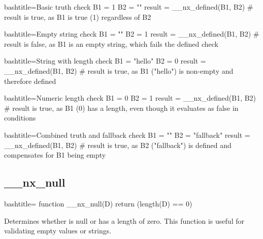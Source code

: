 \begin{NexCodeBox}{bash}{title={Basic truth check}}
	B1 = 1
	B2 = ""
	result = __nx_defined(B1, B2)
	# result is true, as B1 is true (1) regardless of B2
\end{NexCodeBox}

\begin{NexCodeBox}{bash}{title={Empty string check}}
	B1 = ""
	B2 = 1
	result = __nx_defined(B1, B2)
	# result is false, as B1 is an empty string, which fails the defined check
\end{NexCodeBox}

\begin{NexCodeBox}{bash}{title={String with length check}}
	B1 = "hello"
	B2 = 0
	result = __nx_defined(B1, B2)
	# result is true, as B1 ("hello") is non-empty and therefore defined
\end{NexCodeBox}

\begin{NexCodeBox}{bash}{title={Numeric length check}}
	B1 = 0
	B2 = 1
	result = __nx_defined(B1, B2)
	# result is true, as B1 (0) has a length, even though it evaluates as false in conditions
\end{NexCodeBox}

\begin{NexCodeBox}{bash}{title={Combined truth and fallback check}}
	B1 = ""
	B2 = "fallback"
	result = __nx_defined(B1, B2)
	# result is true, as B2 ("fallback") is defined and compensates for B1 being empty
\end{NexCodeBox}

\newpage
\subsection{__nx_null}
\label{__nx_null}
\begin{NexCodeBox}{bash}{title={}}
function __nx_null(D) {
	return (length(D) == 0)
}
\end{NexCodeBox}

\begin{NexMainBox}
	\begin{NexMainBox}
		Determines whether  is null or has a length of zero. This function is useful for validating empty values or strings.
	\end{NexMainBox}
	\begin{NexMainBox}
		\begin{NexListDark}
		\end{NexListDark}
	\end{NexMainBox}
\end{NexMainBox}

